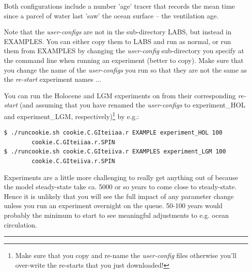 Both configurations include a number 'age' tracer that records the mean time since a parcel of water last 'saw' the ocean surface -- the ventilation age.

\vspace{1mm}
Note that the \textit{user-configs} are not in the sub-directory \textsf{\footnotesize LABS}, but instead in \textsf{\footnotesize EXAMPLES}. You can either copy them to \textsf{\footnotesize LABS} and run as normal, or run them from \textsf{\footnotesize EXAMPLES} by changing the \textit{user-config} sub-directory you specify at the command line when running an experiment (better to copy). Make sure that you change the name of the \textit{user-configs} you run so that they are not the same as the \textit{re-start} experiment names ...

\vspace{1mm}
You can run the Holocene and LGM experiments on from their corresponding \textit{re-start} (and assuming that you have renamed the \textit{user-configs} to \textsf{\footnotesize experiment\_HOL} and \textsf{\footnotesize experiment\_LGM}, respectively)\footnote{Make sure that you copy and re-name the \textit{user-config} files otherwise you'll over-write the re-starts that you just downloaded!} by e.g.:

\small\vspace{-2pt}\begin{verbatim}
$ ./runcookie.sh cookie.C.GIteiiaa.r EXAMPLE experiment_HOL 100 
        cookie.C.GIteiiaa.r.SPIN 
$ ./runcookie.sh cookie.C.GIteiiva.r EXAMPLES experiment_LGM 100 
        cookie.C.GIteiiva.r.SPIN
\end{verbatim}\vspace{-2pt}\normalsize

\newpage

Experiments are a little more challenging to really get anything out of because the model steady-state take ca. 5000 or so years to come close to steady-state. Hence it is unlikely that you will see the full impact of any parameter change unless you run an experiment overnight on the queue. 50-100 years would probably the minimum to start to see meaningful adjustments to e.g. ocean circulation.

\vspace{1mm}
\noindent\rule{4cm}{0.5pt}
\vspace{2mm}

